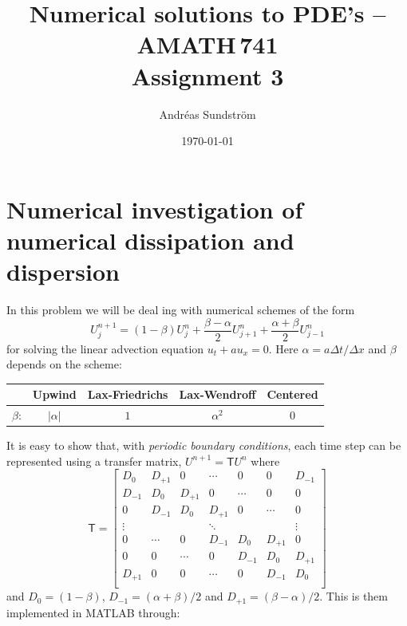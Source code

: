 \documentclass[11pt,letter, swedish, english
]{article}
\newcommand{\Dx}{\ensuremath{\Delta{x}}}
\newcommand{\Dt}{\ensuremath{\Delta{t}}}
\begin{document}

\title{Numerical solutions to PDE's -- AMATH\,741 \\
Assignment 3}
\author{Andréas Sundström}
\date{\today}

\maketitle


\section{Numerical investigation of numerical dissipation and dispersion}
In this problem we will be deal ing with numerical schemes of the form
\begin{equation}
U_j^{n+1}=(1-\beta)U_j^n+\frac{\beta-\alpha}{2}U_{j+1}^n+\frac{\alpha+\beta}{2}U_{j-1}^n
\end{equation}
for solving the linear advection equation $u_t+au_x=0$. Here
$\alpha=a\Dt/\Dx$ and $\beta$ depends on the scheme:
\begin{center}
\begin{tabular}{l|c|c|c|c|}\cline{2-5}
&Upwind&Lax-Friedrichs&Lax-Wendroff&Centered\\ \hline
\multicolumn{1}{|l|}{$\beta$: }&$|\alpha|$&$1$&$\alpha^2$&0\\ \hline
\end{tabular}
\end{center}

It is easy to show that, with \emph{periodic boundary conditions},
each time step can be represented using a transfer matrix,
$U^{n+1}=\mathsf{T}U^n$ where
\begin{equation}
\mathsf{T}=\begin{bmatrix}
D_0&D_{+1}&0&\cdots&0&0&D_{-1}\\
D_{-1}&D_0&D_{+1}&0&\cdots&0&0\\
0&D_{-1}&D_0&D_{+1}&0&\cdots&0\\
\vdots&&&\ddots&&&\vdots\\
0&\cdots&0&D_{-1}&D_0&D_{+1}&0\\
0&0&\cdots&0&D_{-1}&D_0&D_{+1}\\
D_{+1}&0&0&\cdots&0&D_{-1}&D_0\\
\end{bmatrix}
\end{equation}
and $D_0=(1-\beta)$, $D_{-1}=(\alpha+\beta)/2$ and
$D_{+1}=(\beta-\alpha)/2$. 
This is them implemented in MATLAB through:

\end{document}
